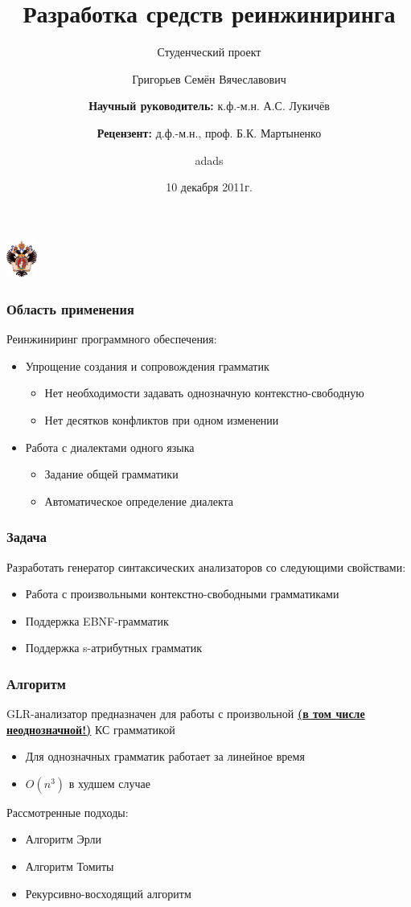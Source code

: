 \documentclass{beamer}
\title[]{Разработка средств реинжиниринга}
\subtitle[студроект]{Студенческий проект}
\institute[СПбГУ]{
Санкт-Петербургский государственный университет \\
Математико-Механический факультет \\
Кафедра системного программирования }
\author[]{Григорьев Семён Вячеславович \\
  \and  
  {\bfseries Научный руководитель:} к.ф.-м.н. А.С. Лукичёв \\ 
  \and
  {\bfseries Рецензент:} д.ф.-м.н., проф. Б.К. Мартыненко  
}
\date{10 декабря 2011г.}
\begin{document}
{

\begin{frame}
\begin{center}
{\includegraphics[width=1cm]{SPbGU_Logo.png}}
\end{center}
\titlepage
\end{frame}
}

\begin{frame}
	\transwipe[direction=90]
	\frametitle{Область применения}
Реинжиниринг программного обеспечения:
	\begin{itemize}
		\item Упрощение создания и сопровождения грамматик
			\begin{itemize}
				\item Нет необходимости задавать однозначную контекстно-свободную
				\item Нет десятков конфликтов при одном изменении
			\end{itemize}
		\item Работа с диалектами одного языка
			\begin{itemize}
				\item Задание общей грамматики
				\item Автоматическое определение диалекта
			\end{itemize}		
	\end{itemize}
\end{frame}


\begin{frame}
	\transwipe[direction=90]
	\frametitle{Задача}
	Разработать генератор синтаксических анализаторов со следующими свойствами:  
	\begin{itemize}
		\item Работа с произвольными контекстно-свободными грамматиками
		\item Поддержка EBNF-грамматик
		\item Поддержка s-атрибутных грамматик
	\end{itemize}
\end{frame}

\begin{frame}
	\transwipe[direction=90]
	\frametitle{Алгоритм}
        \author[12]{adads}
	 GLR-анализатор предназначен для работы с произвольной {\bfseries{\underline {(в том числе неоднозначной!)}}} КС  грамматикой
	\begin{itemize}
		\item Для однозначных грамматик работает за линейное время
    \item {$O(n^{3})$ в худшем случае}
	\end{itemize}
	Рассмотренные подходы:
	\begin{itemize}
			\item Алгоритм Эрли				
			\item Алгоритм Томиты				
			\item Рекурсивно-восходящий алгоритм				
	\end{itemize}					
\end{frame}
\end{document}
